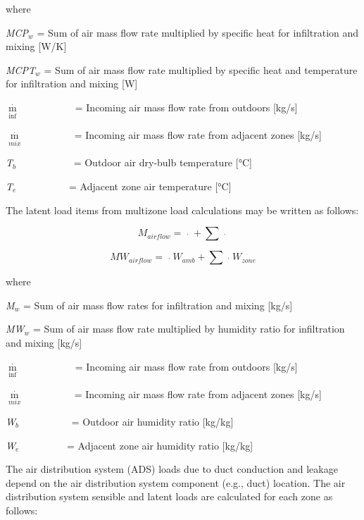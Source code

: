 where

\emph{MCP\(_{w}\)} = Sum of air mass flow rate multiplied by specific heat for infiltration and mixing {[}W/K{]}

\emph{MCPT\(_{w}\)} = Sum of air mass flow rate multiplied by specific heat and temperature for infiltration and mixing {[}W{]}

\({\mathop m\limits^\cdot_{\inf }}\) ~~~~~~~~~~ = Incoming air mass flow rate from outdoors {[}kg/s{]}

\({\mathop m\limits^\cdot_{mix}}\) ~~~~~~~~~ = Incoming air mass flow rate from adjacent zones {[}kg/s{]}

\emph{T\(_{b}\)}~~~~~~~~~~~ = Outdoor air dry-bulb temperature {[}°C{]}

\emph{T\(_{e}\)}~~~~~~~~~~ = Adjacent zone air temperature {[}°C{]}

The latent load items from multizone load calculations may be written as follows:

\begin{equation}
{M_{airflow}} = \mathop {{m_{\inf }}}\limits^\cdot   + \sum {\mathop {{m_{mix}}}\limits^\cdot  }
\end{equation}

\begin{equation}
M{W_{airflow}} = \mathop {{m_{\inf }}}\limits^\cdot  {W_{amb}} + \sum {\mathop {{m_{mix}}}\limits^\cdot  } {W_{zone}}
\end{equation}

where

\emph{M\(_{w}\)} = Sum of air mass flow rates for infiltration and mixing {[}kg/s{]}

\emph{MW\(_{w}\)} = Sum of air mass flow rate multiplied by humidity ratio for infiltration and mixing {[}kg/s{]}

\({\mathop m\limits^\cdot_{\inf }}\) ~~~~~~~~~~ = Incoming air mass flow rate from outdoors {[}kg/s{]}

\({\mathop m\limits^\cdot_{mix}}\) ~~~~~~~~~ = Incoming air mass flow rate from adjacent zones {[}kg/s{]}

\emph{W\(_{b}\)}~~~~~~~~~~ = Outdoor air humidity ratio {[}kg/kg{]}

\emph{W\(_{e}\)}~~~~~~~~~ = Adjacent zone air humidity ratio {[}kg/kg{]}

The air distribution system (ADS) loads due to duct conduction and leakage depend on the air distribution system component (e.g., duct) location. The air distribution system sensible and latent loads are calculated for each zone as follows:

